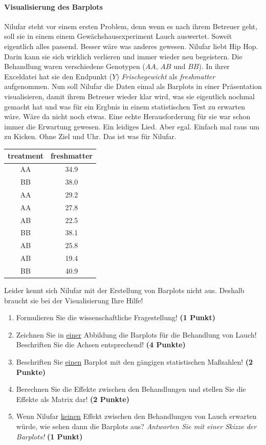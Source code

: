 \documentclass[a4paper, 9pt]{scrartcl}\usepackage[]{graphicx}\usepackage[]{xcolor}
\begin{document}
\ifcollection
\paragraph{Visualisierung des Barplots}
\fi

Nilufar steht vor einem ersten Problem, denn wenn es nach ihrem Betreuer geht, soll sie in einem einem Gewächshausexperiment Lauch auswertet. Soweit eigentlich alles passend. Besser wäre was anderes gewesen. Nilufar liebt Hip Hop. Darin kann sie sich wirklich verlieren und immer wieder neu begeistern. Die Behandlung waren verschiedene Genotypen ($AA$, $AB$ und $BB$). In ihrer Exceldatei hat sie den Endpunkt ($Y$) \textit{Frischegewicht} als \textit{freshmatter} aufgenommen. Nun soll Nilufar die Daten eimal als Barplots in einer Präsentation visualisieren, damit ihrem Betreuer wieder klar wird, was sie eigentlich nochmal gemacht hat und was für ein Ergbnis in einem statistischen Test zu erwarten wäre. Wäre da nicht noch etwas. Eine echte Herausforderung für sie war schon immer die Erwartung gewesen. Ein leidiges Lied. Aber egal. Einfach mal raus um zu Kicken. Ohne Ziel und Uhr. Das ist was für Nilufar.

\begin{table}[!h]
\centering
\begin{tabular}{cc}
\toprule
treatment & freshmatter\\
\midrule
AA & 34.9\\
BB & 38.0\\
AA & 29.2\\
AA & 27.8\\
AB & 22.5\\
\addlinespace
BB & 38.1\\
AB & 25.8\\
AB & 19.4\\
BB & 40.9\\
\bottomrule
\end{tabular}
\end{table}



Leider kennt sich Nilufar mit der Erstellung von Barplots nicht aus. Deshalb braucht sie bei der Visualisierung Ihre Hilfe!

\begin{enumerate}
\item Formulieren Sie die wissenschaftliche Fragestellung! \textbf{(1 Punkt)}
\item Zeichnen Sie in \underline{einer} Abbildung die Barplots für die Behandlung von Lauch! Beschriften Sie die Achsen entsprechend! \textbf{(4 Punkte)}
\item Beschriften Sie \underline{einen} Barplot mit den gängigen statistischen Maßzahlen! \textbf{(2 Punkte)}
\item Berechnen Sie die Effekte zwischen den Behandlungen und stellen Sie die Effekte als Matrix dar! \textbf{(2 Punkte)}
\item Wenn Nilufar \underline{keinen} Effekt zwischen den Behandlungen von Lauch erwarten würde, wie sehen dann die Barplots aus? \textit{Antworten Sie mit einer Skizze der Barplots!}
  \textbf{(1 Punkt)}
\end{enumerate} 
\clearpage
\end{document}
